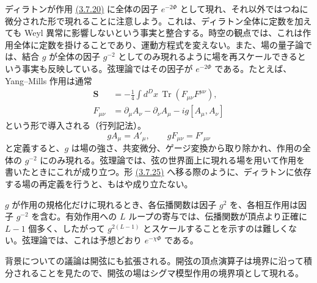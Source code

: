ディラトンが作用 \hyperref[eq:3.7.20]{(3.7.20)} に全体の因子 $e^{-2\Phi}$ として現れ、それ以外ではつねに微分された形で現れることに注意しよう。これは、ディラトン全体に定数を加えても Weyl 異常に影響しないという事実と整合する。時空の観点では、これは作用全体に定数を掛けることであり、運動方程式を変えない。また、場の量子論では、結合 $g$ が全体の因子 $g^{-2}$ としてのみ現れるように場を再スケールできるという事実も反映している。弦理論ではその因子が $e^{-2\Phi}$ である。たとえば、Yang--Mills 作用は通常
\begin{align}
\bm S&=-\frac14\int d^Dx\,\operatorname{Tr}(F_{\mu\nu}F^{\mu\nu}),
\tag{3.7.27a}\label{eq:3.7.27a}\\
F_{\mu\nu}&=\partial_\mu A_\nu-\partial_\nu A_\mu-ig[A_\mu,A_\nu]
\tag{3.7.27b}\label{eq:3.7.27b}
\end{align}
という形で導入される（行列記法）。
\begin{equation}
gA_\mu=A'_\mu,\qquad gF_{\mu\nu}=F'_{\mu\nu}
\tag{3.7.28}\label{eq:3.7.28}
\end{equation}
と定義すると、$g$ は場の強さ、共変微分、ゲージ変換から取り除かれ、作用の全体の $g^{-2}$ にのみ現れる。弦理論では、弦の世界面上に現れる場を用いて作用を書いたときにこれが成り立つ。形 \hyperref[eq:3.7.25]{(3.7.25)} へ移る際のように、ディラトンに依存する場の再定義を行うと、もはや成り立たない。

$g$ が作用の規格化だけに現れるとき、各伝播関数は因子 $g^2$ を、各相互作用は因子 $g^{-2}$ を含む。有効作用への $L$ ループの寄与では、伝播関数が頂点より正確に $L-1$ 個多く、したがって $g^{2(L-1)}$ とスケールすることを示すのは難しくない。弦理論では、これは予想どおり $e^{-\chi\Phi}$ である。

背景についての議論は開弦にも拡張される。開弦の頂点演算子は境界に沿って積分されることを見たので、開弦の場はシグマ模型作用の境界項として現れる。


